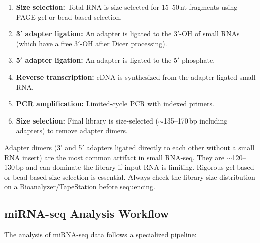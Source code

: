 \begin{protocolbox}[title={Small RNA-seq Library Preparation}]
\begin{enumerate}[nosep]
  \item \textbf{Size selection:} Total RNA is size-selected for 15--50\,nt
    fragments using PAGE gel or bead-based selection.
  \item \textbf{3$'$ adapter ligation:} An adapter is ligated to the 3$'$-OH of
    small RNAs (which have a free 3$'$-OH after Dicer processing).
  \item \textbf{5$'$ adapter ligation:} An adapter is ligated to the 5$'$
    phosphate.
  \item \textbf{Reverse transcription:} cDNA is synthesized from the
    adapter-ligated small RNA.
  \item \textbf{PCR amplification:} Limited-cycle PCR with indexed primers.
  \item \textbf{Size selection:} Final library is size-selected ($\sim$135--170\,bp
    including adapters) to remove adapter dimers.
\end{enumerate}
\end{protocolbox}

\begin{warningbox}[title={Adapter Dimers in Small RNA-seq}]
Adapter dimers (3$'$ and 5$'$ adapters ligated directly to each other without
a small RNA insert) are the most common artifact in small RNA-seq. They are
$\sim$120--130\,bp and can dominate the library if input RNA is limiting.
Rigorous gel-based or bead-based size selection is essential. Always check the
library size distribution on a Bioanalyzer/TapeStation before sequencing.
\end{warningbox}

\subsection{miRNA-seq Analysis Workflow}

The analysis of miRNA-seq data follows a specialized pipeline:

